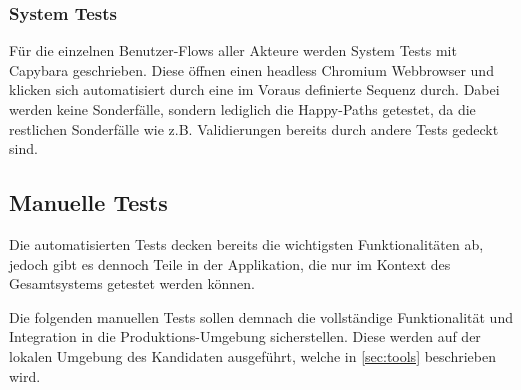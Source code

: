 \subsubsection{System Tests}
Für die einzelnen Benutzer-Flows aller Akteure werden System Tests mit Capybara geschrieben.
Diese öffnen einen headless Chromium Webbrowser und klicken sich automatisiert durch eine im Voraus definierte Sequenz durch.
Dabei werden keine Sonderfälle, sondern lediglich die Happy-Paths getestet, da die restlichen Sonderfälle wie z.B. Validierungen bereits durch andere Tests gedeckt sind.

\newpage

\subsection{Manuelle Tests}

Die automatisierten Tests decken bereits die wichtigsten Funktionalitäten ab,
jedoch gibt es dennoch Teile in der Applikation, die nur im Kontext des Gesamtsystems getestet werden können.

Die folgenden manuellen Tests sollen demnach die vollständige Funktionalität und Integration in die Produktions-Umgebung sicherstellen.
Diese werden auf der lokalen Umgebung des Kandidaten ausgeführt, welche in \ref{sec:tools} beschrieben wird.

